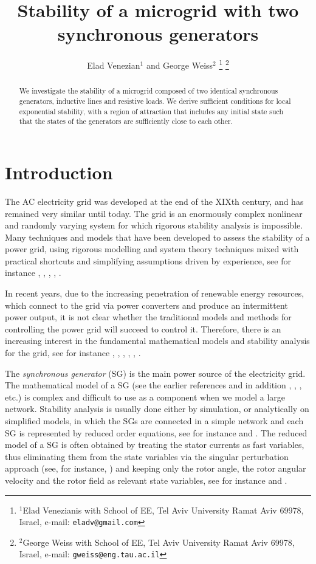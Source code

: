\documentclass[letterpaper, 10 pt, conference]{ieeeconf}
\title{\LARGE \bf
Stability of a microgrid with two synchronous generators}
\author{Elad Venezian$^{1}$ and George Weiss$^{2}$%
\thanks{$^{1}$Elad Venezianis with School of EE,
        Tel Aviv University Ramat Aviv 69978, Israel,
        e-mail: {\tt\small eladv@gmail.com}}%
\thanks{$^{2}$George Weiss with School of EE,
        Tel Aviv University Ramat Aviv 69978, Israel,
        e-mail: {\tt\small gweiss@eng.tau.ac.il}}}
\begin{document}
\maketitle
\thispagestyle{empty}
\pagestyle{empty}

\begin{abstract}
We investigate the stability of a microgrid composed of two identical
synchronous generators, inductive lines and resistive loads. We 
derive sufficient conditions for local exponential stability, with 
a region of attraction that includes any initial state such that the 
states of the generators are sufficiently close to each other. 
\end{abstract}

\section{Introduction}

The AC electricity grid was developed at the end of the XIXth century,
and has remained very similar until today. The grid is an enormously
complex nonlinear and randomly varying system for which rigorous
stability analysis is impossible. Many techniques and models that have
been developed to assess the stability of a power grid, using rigorous
modelling and system theory techniques mixed with practical shortcuts
and simplifying assumptions driven by experience, see for instance
\cite{Kundur}, \cite{GrSt2014}, \cite{SauerPai1998}, \cite{GOBS:03},
\cite{DoBull:12}.

In recent years, due to the increasing penetration of renewable energy
resources, which connect to the grid via power converters and produce
an intermittent power output, it is not clear whether the traditional
models and methods for controlling the power grid will succeed to
control it. Therefore, there is an increasing interest in the
fundamental mathematical models and stability analysis for the grid,
see for instance \cite{DoBull:12}, \cite{PoDoBu:13}, \cite{CaTa:14},
\cite{NaWe:14}, \cite{NaWe:15}, \cite{DePersiSchaft:16}.

The {\em synchronous generator} (SG) is the main power source of the
electricity grid. The mathematical model of a SG (see the earlier
references and in addition \cite{Walker:94}, \cite{Fitzgerald:03},
\cite{MaWe:15}, etc.) is complex and difficult to use as a component
when we model a large network. Stability analysis is usually done
either by simulation, or analytically on simplified models, in which
the SGs are connected in a simple network and each SG is represented
by reduced order equations, see for instance \cite{DoBull:12} and
\cite{PoDoBu:13}. The reduced model of a SG is often obtained by
treating the stator currents as fast variables, thus eliminating them
from the state variables via the singular perturbation approach (see,
for instance, \cite{Khalil}) and keeping only the rotor angle, the
rotor angular velocity and the rotor field as relevant state
variables, see for instance \cite{Kundur} and \cite{SauerPai1998}.
\end{document}
